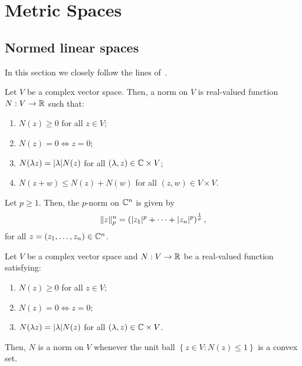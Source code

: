 \chapter{Metric Spaces}\label{chp:metric-spaces}

\section{Normed linear spaces}

In this section we closely follow the lines
of~\cite{yet_another_proof_of_minkowskis_inequality}.

\begin{definition}\label{def:normed-linear-spaces}
  Let \(V\) be a complex vector space. Then, a norm on \(V\) is real-valued
  function \(N:V\to\mathbb{R}\) such that:
  \begin{enumerate}
    \item
      \(N(z)\geqslant{0}\) for all \(z\in{V}\);
    \item
      \(N(z)=0\iff{z=0}\);
    \item
      \(N(\lambda{z})=\lvert\lambda\rvert N(z)\) for all
      \((\lambda,z)\in\mathbb{C}\times{V}\);
    \item
      \(N(z+w)\leqslant{N(z)+N(w)}\) for all \((z,w)\in{V\times{V}}\).
  \end{enumerate}
\end{definition}

\begin{definition}
  Let \(p\geqslant{1}\). Then, the \(p\)-norm on \(\mathbb{C}^{n}\) is given by
  \[
    \norm<n>(p)[z]
    =
    \left(\abs{z_{1}}^{p}+\cdots+\abs{z_{n}}^{p}\right)^{\frac{1}{p}},
  \]
  for all \(z=(z_{1},\ldots,z_{n})\in\mathbb{C}^{n}\).
\end{definition}

\begin{lemma}
  Let \(V\) be a complex vector space and \(N:V\to\mathbb{R}\) be a real-valued
  function satisfying:
  \begin{enumerate}
    \item
      \(N(z)\geqslant{0}\) for all \(z\in{V}\);
    \item
      \(N(z)=0\iff{z=0}\);
    \item
      \(N(\lambda{z})=\lvert\lambda\rvert N(z)\) for all
      \((\lambda,z)\in\mathbb{C}\times{V}\).
  \end{enumerate}
  Then, \(N\) is a norm on \(V\) whenever the unit ball
  \(\left\{z\in{V}:N(z)\leqslant{1}\right\}\) is a convex set.
\end{lemma}

